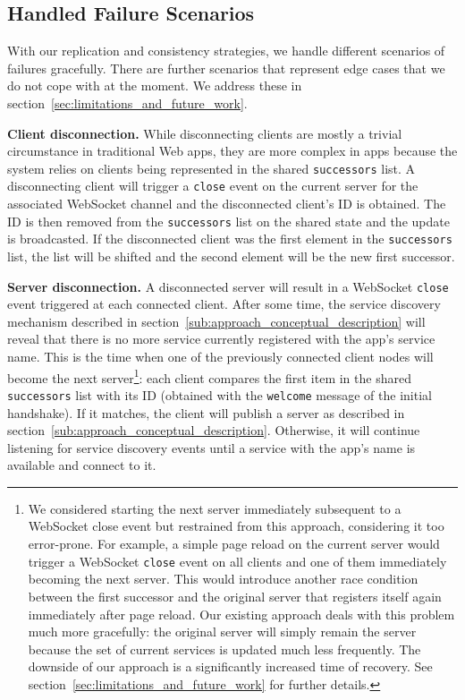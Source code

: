 \subsection{Handled Failure Scenarios}
\label{sub:approach_handled_failure_scenarios}

With our replication and consistency strategies, we handle different scenarios of failures gracefully. There are further scenarios that represent edge cases that we do not cope with at the moment. 
We address these in section~\ref{sec:limitations_and_future_work}.

\textbf{Client disconnection.} 
While disconnecting clients are mostly a trivial circumstance in traditional Web apps, they are more complex in \APIshort apps because the system relies on clients being represented in the shared \texttt{successors} list. 
A disconnecting client will trigger a \texttt{close} event on the current server for the associated WebSocket channel and the disconnected client's ID is obtained. 
The ID is then removed from the \texttt{successors} list on the shared state and the update is broadcasted. 
If the disconnected client was the first element in the \texttt{successors} list, the list will be shifted and the second element will be the new first successor.

\textbf{Server disconnection.} 
A disconnected server will result in a WebSocket \texttt{close} event triggered at each connected client. 
After some time, the service discovery mechanism described in section~\ref{sub:approach_conceptual_description} will reveal that there is no more service currently registered with the app's service name. 
This is the time when one of the previously connected client nodes will become the next server\footnote{We considered starting the next server immediately subsequent to a WebSocket close event but restrained from this approach, considering it too error-prone. For example, a simple page reload on the current server would trigger a WebSocket \texttt{close} event on all clients and one of them immediately becoming the next server. This would introduce another race condition between the first successor and the original server that registers itself again immediately after page reload. Our existing approach deals with this problem much more gracefully: the original server will simply remain the server because the set of current services is updated much less frequently. The downside of our approach is a significantly increased time of recovery. See section~\ref{sec:limitations_and_future_work} for further details.}: each client compares the first item in the shared \texttt{successors} list with its ID (obtained with the \texttt{welcome} message of the initial handshake). 
If it matches, the client will publish a server as described in section~\ref{sub:approach_conceptual_description}. 
Otherwise, it will continue listening for service discovery events until a service with the app's name is available and connect to it.

